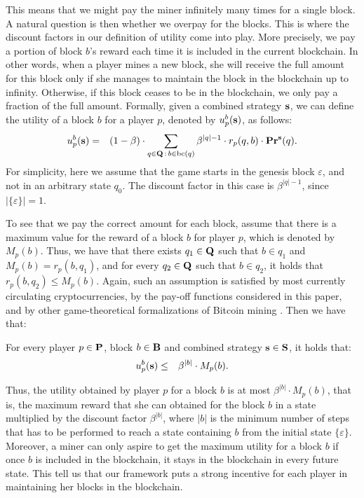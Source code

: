 This means that we might pay the miner infinitely many times for a single block. A natural question is then whether we overpay for the blocks. This is where the discount factors in our definition of utility come into play.  More precisely, we pay a portion of block $b$'s reward each time it is included in the current blockchain. In other words, 
when a player mines a new block, she will receive the full amount for this block only if she manages to maintain the block in the blockchain up to infinity. Otherwise, if this block 
ceases to be in the blockchain, we only pay a fraction of the full amount. Formally, given a combined strategy $\mathbf{s}$, we can define the utility of a block $b$ for a player $p$, denoted by $u_p^b(\mathbf{s})$,  as follows:
\begin{eqnarray*}
u_p^b(\mathbf{s}) & =  & (1 - \beta) \cdot  \sum_{q \in \mathbf{Q} \,:\, b \in \text{bc}(q)} \beta^{|q|-1} \cdot  r_p(q,b) \cdot \mathbf{Pr}^{\mathbf{s}}(q).
\end{eqnarray*}
For simplicity, here we assume that the game starts in the genesis block $\varepsilon$, and not in an arbitrary state $q_0$. The discount factor in this case is $\beta^{|q|-1}$, since $|\{\varepsilon\}|= 1$.  


To see that we pay the correct amount for each block, assume that there is a maximum value for the reward of a block $b$ for player $p$, which is denoted by $M_p(b)$. Thus, we have that there exists $q_1 \in \mathbf{Q}$ such that $b \in q_1$ and $M_p(b) = r_p(b,q_1)$, and for every $q_2 \in \mathbf{Q}$ such that $b \in q_2$, it holds that $r_p(b,q_2) \leq M_p(b)$. Again, such an assumption is satisfied by most currently circulating cryptocurrencies, by the pay-off functions considered in this paper, and by other game-theoretical formalizations of Bitcoin mining \cite{mininggames:2016}. Then we have that:
\begin{myprop}\label{prop-ub-block}
For every player $p \in \mathbf{P}$, block $b \in \mathbf{B}$ and combined strategy $\mathbf{s} \in \mathbf{S}$, it holds that:
\begin{eqnarray*}
u^b_p(\mathbf{s}) & \leq &  \beta^{|b|} \cdot M_p(b).
\end{eqnarray*}
\end{myprop}
Thus, the utility obtained by player $p$ for a block $b$ is at most $\beta^{|b|} \cdot M_p(b)$, that is, the maximum reward that she can obtained for the block $b$ in a state multiplied by the discount factor $\beta^{|b|}$, where $|b|$ is the minimum number of steps that has to be performed to reach a state containing $b$ from the initial state $\{\varepsilon\}$. 
Moreover, a miner can only aspire to get the maximum utility for a block $b$ if once $b$ is included in the blockchain, it stays in the blockchain in every future state. This tell us that our framework puts a strong incentive for each player in maintaining her blocks in the blockchain.

